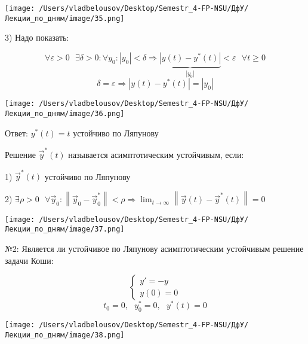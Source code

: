 \documentclass[12pt, a4paper]{report}
\begin{document}
\begin{center}
    \texttt{[image: /Users/vladbelousov/Desktop/Semestr\_4-FP-NSU/ДфУ/Лекции\_по\_дням/image/35.png]}
\end{center}

3) Надо показать: 

\[ \forall  \varepsilon > 0 \text{ }  \exists  \delta > 0 : \forall  y_0 : \left\lvert y_0  \right\rvert < \delta \Rightarrow\underbrace{ \left\lvert  y(t) - y^* (t )  \right\rvert}_{|y_0|} < \varepsilon \text{ } \forall  t \ge 0 \] 
\[ \delta = \varepsilon \Rightarrow \left\lvert y(t ) - y^ * (t )  \right\rvert = \left\lvert y_0 \right\rvert \] 

\begin{center}
    \texttt{[image: /Users/vladbelousov/Desktop/Semestr\_4-FP-NSU/ДфУ/Лекции\_по\_дням/image/36.png]}
\end{center}

Ответ: \( y^* (t ) = t  \)  устойчиво по Ляпунову

\begin{definition}
    Решение \( \vec{y } ^* (t )  \) называется асимптотическим устойчивым, если: 

    1) \( \vec{y } ^* (t )  \) устойчиво по Ляпунову 

    2) \( \exists  \rho > 0 \text{ }  \forall  \vec{y } _0 : \left\lVert \vec{y } _ 0 - \vec{y }  ^* _0  \right\rVert < \rho \displaystyle \Rightarrow \lim_{t     \to \infty} \left\lVert \vec{y } (t ) - \vec{y}  ^* (t ) \right\rVert = 0  \) 

    \begin{center}
        \texttt{[image: /Users/vladbelousov/Desktop/Semestr\_4-FP-NSU/ДфУ/Лекции\_по\_дням/image/37.png]}
    \end{center}
\end{definition}

№2: Является ли устойчивое по Ляпунову асимптотическим устойчивым решение задачи Коши: 

\[ \begin{cases}
y ' = - y \\ 
y(0 )=  0
\end{cases} \] 
\[ t_0 = 0 , \text{ }  y_0 ^{* }  = 0  , \text{ }  y^{* }  (t ) = 0 \] 

\begin{center}
    \texttt{[image: /Users/vladbelousov/Desktop/Semestr\_4-FP-NSU/ДфУ/Лекции\_по\_дням/image/38.png]}
\end{center}
\end{document}
